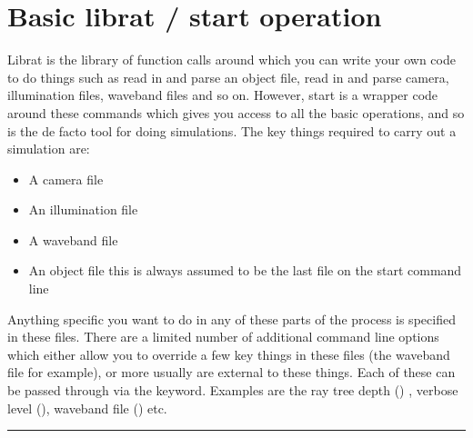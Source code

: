 \documentclass[letterpaper,10pt,english]{sphinxmanual}
\begin{document}
{
\begin{sphinxVerbatim}[commandchars=\\\{\}]
\llap{\color{nbsphinxin}[ ]:\,\hspace{\fboxrule}\hspace{\fboxsep}}
\end{sphinxVerbatim}
}


\chapter{Basic librat / start operation}
\label{\detokenize{Chapter2:Basic-librat-/-start-operation}}\label{\detokenize{Chapter2::doc}}
Librat is the library of function calls around which you can write your own code to do things such as read in and parse an object file, read in and parse camera, illumination files, waveband files and so on. However, start is a wrapper code around these commands which gives you access to all the basic operations, and so is the de facto tool for doing simulations. The key things required to carry out a simulation are:
\begin{itemize}
\item {} 
A camera file

\item {} 
An illumination file

\item {} 
A waveband file

\item {} 
An object file \sphinxhyphen{} this is always assumed to be the last file on the start command line

\end{itemize}

Anything specific you want to do in any of these parts of the process is specified in these files. There are a limited number of additional command line options which either allow you to override a few key things in these files (the waveband file for example), or more usually are external to these things. Each of these can be passed through via the  keyword. Examples are the ray tree depth () , verbose level (), waveband file () etc.


\bigskip\hrule\bigskip
\end{document}
